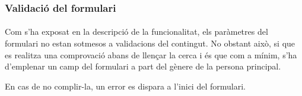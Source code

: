 \subsubsection{Validació del formulari}

\paragraph{}
Com s'ha exposat en la descripció de la funcionalitat, els paràmetres del formulari no estan sotmesos a validacions del contingut. No obstant això, si que es realitza una comprovació abans de llençar la cerca i és que com a mínim, s'ha d’emplenar un camp del formulari a part del gènere de la persona principal.

En cas de no complir-la, un error es dispara a l’inici del formulari.
